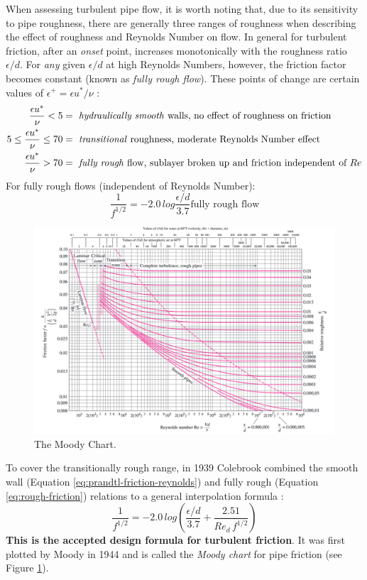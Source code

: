 \documentclass[10pt]{article} %
\numberwithin{equation}{section} %
\begin{document}
\begin{multicols}{2}
When assessing turbulent pipe flow, it is worth noting that, due to its sensitivity to pipe roughness, there are generally three ranges of roughness when describing the effect of roughness and Reynolds Number on flow. In general for turbulent friction, after an \textit{onset} point, increases monotonically with the roughness ratio $\epsilon/d$. For \textit{any} given $\epsilon/d$ at high Reynolds Numbers, however, the friction factor becomes constant (known as \textit{fully rough flow}). These points of change are certain values of $\epsilon^{+} = \epsilon u^{*}/\nu$ \cite{fluid-mechanics}:
\begin{align*}
\frac{\epsilon u^{*}}{\nu} < 5 &= \text{ \textit{hydraulically smooth} walls, no effect of roughness on friction} \\
5 \leq \frac{\epsilon u^{*}}{\nu} \leq 70 &= \text{ \textit{transitional} roughness, moderate Reynolds Number effect} \\
\frac{\epsilon u^{*}}{\nu} > 70 &= \text{ \textit{fully rough} flow, sublayer broken up and friction independent of } Re
\end{align*}
For fully rough flows (independent of Reynolds Number):
\begin{equation} \label{eq:rough-friction}
\frac{1}{f^{1/2}} = -2.0\, log \frac{\epsilon/d}{3.7} \text{fully rough flow}
\end{equation}
\begin{figure}[!htb]
\centering
\includegraphics[scale=0.55]{moody_chart}
\caption{The Moody Chart.}
\label{fig:moody-chart}
\end{figure}
To cover the transitionally rough range, in 1939 Colebrook combined the smooth wall (Equation \ref{eq:prandtl-friction-reynolds}) and fully rough (Equation \ref{eq:rough-friction}) relations to a general interpolation formula \cite{fluid-mechanics}:
\begin{equation} \label{eq:moody}
\frac{1}{f^{1/2}} = -2.0\, log \left( \frac{\epsilon/d}{3.7} + \frac{2.51}{Re_{d}\, f^{1/2}} \right)
\end{equation}
\textbf{This is the accepted design formula for turbulent friction}. It was first plotted by Moody in 1944 and is called the \textit{Moody chart} for pipe friction (see Figure \ref{fig:moody-chart}).


\end{multicols}
\end{document}
